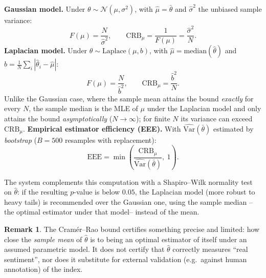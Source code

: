 \documentclass[11pt,a4paper,oneside]{article}
\theoremstyle{definition}
\newtheorem{remark}[definition]{Remark}
\begin{document}
\begin{summaryBox}
\textbf{Gaussian model.} Under $\theta\sim\mathcal N(\mu,\sigma^2)$, with
$\hat\mu=\bar\theta$ and $\hat\sigma^2$ the unbiased sample variance:
\[
F(\mu) = \frac{N}{\hat\sigma^2}, \qquad
\mathrm{CRB}_\mu = \frac{1}{F(\mu)} = \frac{\hat\sigma^2}{N}.
\]
\textbf{Laplacian model.} Under $\theta\sim\mathrm{Laplace}(\mu,b)$, with
$\hat\mu=\mathrm{median}(\hat\theta)$ and $\hat b = \frac1N\sum_i |\hat\theta_i-\hat\mu|$:
\[
F(\mu) = \frac{N}{\hat b^2}, \qquad
\mathrm{CRB}_\mu = \frac{\hat b^2}{N}.
\]
Unlike the Gaussian case, where the sample mean attains the bound \emph{exactly} for every $N$,
the sample median is the MLE of $\mu$ under the Laplacian model and only attains the bound
\emph{asymptotically} ($N\to\infty$); for finite $N$ its variance can exceed $\mathrm{CRB}_\mu$.
\textbf{Empirical estimator efficiency (EEE).} With $\widehat{\mathrm{Var}}(\bar\theta)$
estimated by \emph{bootstrap} \cite{Efron1979} ($B=500$ resamples with replacement):
\[
\mathrm{EEE} = \min\!\left(\frac{\mathrm{CRB}_\mu}{\widehat{\mathrm{Var}}(\bar\theta)},\ 1\right).
\]
\end{summaryBox}

The system complements this computation with a Shapiro--Wilk normality test \cite{ShapiroWilk1965}
on $\hat\theta$: if the resulting $p$-value is below $0.05$, the Laplacian model (more robust to
heavy tails) is recommended over the Gaussian one, using the sample median --the optimal
estimator under that model-- instead of the mean.

\begin{remark}
The Cram\'er--Rao bound certifies something precise and limited: how close the \emph{sample
mean} of $\hat\theta$ is to being an optimal estimator of itself under an assumed parametric
model. It does not certify that $\hat\theta$ correctly measures ``real sentiment'', nor does it
substitute for external validation (e.g.\ against human annotation) of the index.
\end{remark}
\end{document}

